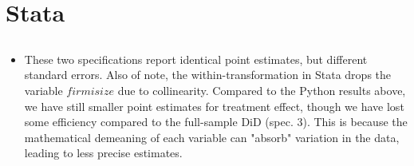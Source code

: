 \documentclass{article}
\begin{document}
\section{Stata}

\subsection{}

\begin{table}[hbt!] \centering


\end{table}

\begin{itemize}
    \item These two specifications report identical point estimates, but different standard errors. Also of note, the within-transformation in Stata drops the variable $firmisize$ due to collinearity. Compared to the Python results above, we have still smaller point estimates for treatment effect, though we have lost some efficiency compared to the full-sample DiD (spec. 3). This is because the mathematical demeaning of each variable can "absorb" variation in the data, leading to less precise estimates.
\end{itemize}
\end{document}
